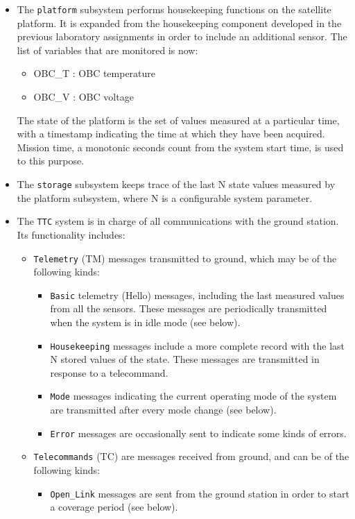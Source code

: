 \begin{itemize}
\item The {\tt platform} subsystem performs housekeeping functions on the satellite platform. It is expanded from the housekeeping component developed in the previous laboratory assignments in order to include an additional sensor. The list of variables that are monitored is now:
\begin{itemize}
\item OBC\_T : OBC temperature
\item OBC\_V : OBC voltage
\end{itemize}
The state of the platform is the set of values measured at a particular time, with a timestamp indicating the time at which they have been acquired. Mission time, a monotonic seconds count from the system start time, is used to this purpose.
\item The {\tt storage} subsystem keeps trace of the last N state values measured by the platform subsystem, where N is a configurable system parameter.
\item The {\tt TTC} system is in charge of all communications with the ground station. Its functionality includes:
\begin{itemize}
\item {\tt Telemetry} (TM) messages transmitted to ground, which may be of the following kinds:
\begin{itemize}
\item {\tt Basic} telemetry (Hello) messages, including the last measured values from all the sensors. These messages are periodically transmitted when the system is in idle mode (see below).
\item {\tt Housekeeping} messages include a more complete record with the last N stored values of the state. These messages are transmitted in response to a telecommand.
\item {\tt Mode} messages indicating the current operating mode of the system are transmitted after every mode change (see below).
\item {\tt Error} messages are occasionally sent to indicate some kinds of errors.
\end{itemize}
\item {\tt Telecommands} (TC) are messages received from ground, and can be of the following kinds:
\begin{itemize}
\item {\tt Open\_Link} messages are sent from the ground station in order to start a coverage period (see below).

\end{itemize}
\end{itemize}
\end{itemize}
